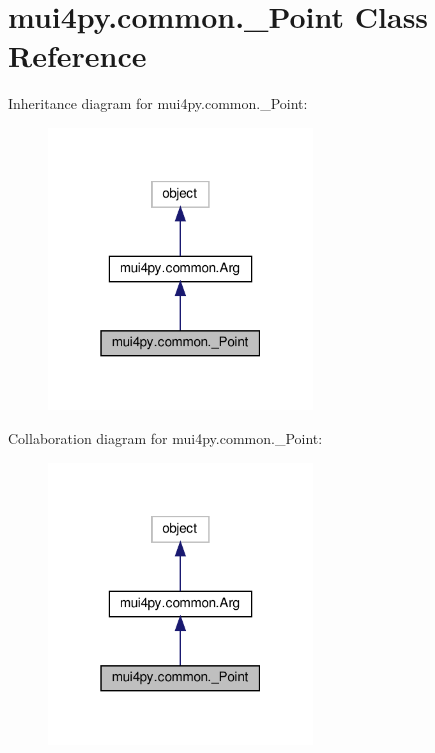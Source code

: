\hypertarget{classmui4py_1_1common_1_1___point}{}\section{mui4py.\+common.\+\_\+\+Point Class Reference}
\label{classmui4py_1_1common_1_1___point}


Inheritance diagram for mui4py.\+common.\+\_\+\+Point\+:
\nopagebreak
\begin{figure}[H]
\begin{center}
\leavevmode
\includegraphics[width=199pt]{classmui4py_1_1common_1_1___point__inherit__graph}
\end{center}
\end{figure}


Collaboration diagram for mui4py.\+common.\+\_\+\+Point\+:
\nopagebreak
\begin{figure}[H]
\begin{center}
\leavevmode
\includegraphics[width=199pt]{classmui4py_1_1common_1_1___point__coll__graph}
\end{center}
\end{figure}
